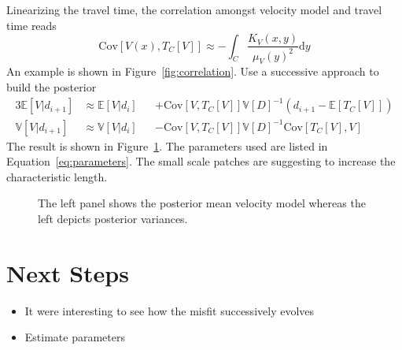 \documentclass[11pt]{article}
\newcommand\Mean[1]{\mathbb{E}\!\left[#1\right]}
\newcommand\Var[1]{\mathbb{V}\!\left[#1\right]}
\newcommand\Cov[2]{\mathrm{Cov}\!\left[#1,#2\right]}
\begin{document}
Linearizing the travel time, the correlation amongst velocity model and travel time reads
\begin{equation}
    \Cov{V(x)}{T_C[V]} \approx -\int_C \frac{K_V(x,y)}{\mu_V(y)^2}  \mathrm d y
\end{equation}
An example is shown in Figure~\ref{fig:correlation}.
Use a successive approach to build the posterior
\begin{alignat}{3}
    \Mean{V|d_{i+1}} &\approx \Mean{V|d_i} &&+ \Cov{V}{T_C[V]}\Var{D}^{-1} \left(d_{i+1}-\Mean{T_C[V]}\right)
    \\
    \Var{V|d_{i+1}}  &\approx \Var{V|d_i}  &&- \Cov{V}{T_C[V]}\Var{D}^{-1}  \Cov{T_C[V]}{V}
\end{alignat}
The result is shown in Figure~\ref{fig:example}. The parameters used are listed in Equation~\ref{eq:parameters}.
The small scale patches are suggesting to increase the characteristic length.

\begin{figure}
    \centering
    
    \caption{The left panel shows the posterior mean velocity model whereas the left depicts posterior variances. }
    \label{fig:example}
\end{figure}


\section{Next Steps}

\begin{itemize}
    \item It were interesting to see how the misfit successively evolves
    \item Estimate parameters
\end{itemize}
\end{document}

